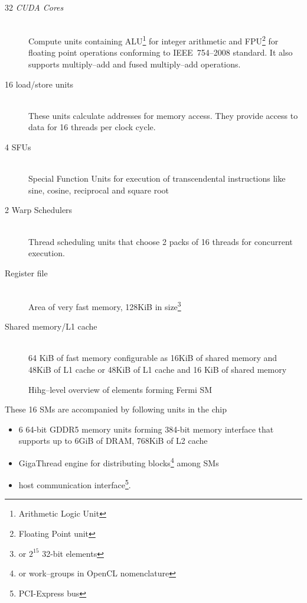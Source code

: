 \begin{description}
  \item[32 \emph{CUDA Cores}] \hfill \\
    Compute units containing ALU\footnote{Arithmetic Logic Unit}
    for integer arithmetic and FPU\footnote{Floating Point unit} for floating point
    operations conforming to IEEE~754--2008 standard. It also supports multiply--add
    and fused multiply--add operations.
  \item[16 load/store units] \hfill \\
    These units calculate addresses for memory access. They provide access to
    data for 16 threads per clock cycle.
  \item[4 SFUs] \hfill \\
    Special Function Units for execution of transcendental instructions
    like sine, cosine, reciprocal and square root
  \item[2 Warp Schedulers] \hfill \\
    Thread scheduling units that choose 2 packs of 16 threads for concurrent
    execution.
  \item[Register file] \hfill \\
    Area of very fast memory, 128KiB in size\footnote{or $2^{15}$ 32-bit elements}
  \item[Shared memory/L1 cache] \hfill \\
    64 KiB of fast memory configurable as
    16KiB of shared memory and 48KiB of L1 cache or 48KiB of L1 cache and 16 KiB
    of shared memory
\end{description}
\begin{figure}[pb]
  \begin{center}
      
  \end{center}
  \caption{Hihg--level overview of elements forming Fermi SM}
  \label{fig:fermism}
\end{figure}

These 16 SMs are accompanied by following units in the chip
\begin{itemize}
  \item 6 64-bit GDDR5 memory units forming 384-bit
memory interface that supports up to 6GiB of DRAM, 768KiB of L2 cache
  \item GigaThread engine for distributing blocks\footnote{or work--groups in OpenCL nomenclature}
  among SMs
  \item host communication interface\footnote{PCI-Express bus}.
\end{itemize}

